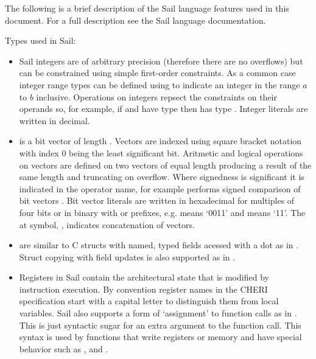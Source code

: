 The following is a brief description of the Sail language features
used in this document. For a full description see the Sail
language documentation.

Types used in Sail:

\label{sailMIPSzbits}
\label{sailRISCVzbits}
\begin{itemize}
\item {} Sail integers are of arbitrary precision (therefore there are no overflows) but can be constrained using simple first-order constraints. As a common case integer range types can be defined using  to indicate an integer in the range $a$ to $b$ inclusive. Operations on integers repsect the constraints on their operands so, for example, if  and  have type  then  has type . Integer literals are written in decimal.
\item {} \label{zbits} is a bit vector of length . Vectors are indexed using square bracket notation with index 0 being the least significant bit. Aritmetic and logical operations on vectors are defined on two vectors of equal length producing a result of the same length and truncating on overflow. Where signedness is significant it is indicated in the operator name, for example  performs signed comparison of bit vectors . Bit vector literals are written in hexadecimal for multiples of four bits or in binary with  or  prefixes, e.g.  means `0011' and  means `11'. The at symbol, , indicates concatenation of vectors.
\item {} are similar to C structs with named, typed fields acessed with a dot as in . Struct copying with field updates is also supported as in .
\item Registers in Sail contain the architectural state that is modified by instruction execution. By convention register names in the CHERI specification start with a capital letter to distinguish them from local variables. Sail also supports a form of `assignment' to function calls as in . This is just syntactic sugar for an extra argument to the function call. This syntax is used by functions that write registers or memory and have special behavior such as ,  and .
\end{itemize}

